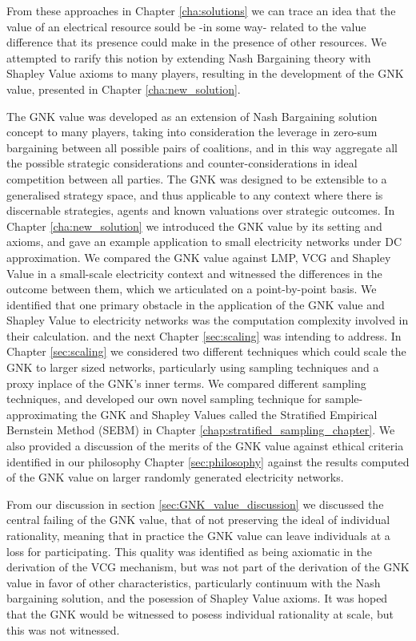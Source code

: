 From these approaches in Chapter \ref{cha:solutions} we can trace an idea that the value of an electrical resource sould be -in some way- related to the value difference that its presence could make in the presence of other resources.
We attempted to rarify this notion by extending Nash Bargaining theory with Shapley Value axioms to many players, resulting in the development of the GNK value, presented in Chapter \ref{cha:new_solution}.

The GNK value was developed as an extension of Nash Bargaining solution concept to many players, taking into consideration the leverage in zero-sum bargaining between all possible pairs of coalitions, and in this way aggregate all the possible strategic considerations and counter-considerations in ideal competition between all parties.
The GNK was designed to be extensible to a generalised strategy space, and thus applicable to any context where there is discernable strategies, agents and known valuations over strategic outcomes. 
In Chapter \ref{cha:new_solution} we introduced the GNK value by its setting and axioms, and gave an example application to small electricity networks under DC approximation.
We compared the GNK value against LMP, VCG and Shapley Value in a small-scale electricity context and witnessed the differences in the outcome between them, which we articulated on a point-by-point basis.
We identified that one primary obstacle in the application of the GNK value and Shapley Value to electricity networks was the computation complexity involved in their calculation.
and the next Chapter \ref{sec:scaling} was intending to address.
In Chapter \ref{sec:scaling} we considered two different techniques which could scale the GNK to larger sized networks, particularly using sampling techniques and a proxy inplace of the GNK's inner terms.
We compared different sampling techniques, and developed our own novel sampling technique for sample-approximating the GNK and Shapley Values called the Stratified Empirical Bernstein Method (SEBM) in Chapter \ref{chap:stratified_sampling_chapter}.
We also provided a discussion of the merits of the GNK value against ethical criteria identified in our philosophy Chapter \ref{sec:philosophy} against the results computed of the GNK value on larger randomly generated electricity networks.

From our discussion in section \ref{sec:GNK_value_discussion} we discussed the central failing of the GNK value, that of not preserving the ideal of individual rationality, meaning that in practice the GNK value can leave individuals at a loss for participating.
This quality was identified as being axiomatic in the derivation of the VCG mechanism, but was not part of the derivation of the GNK value in favor of other characteristics, particularly continuum with the Nash bargaining solution, and the posession of Shapley Value axioms.
It was hoped that the GNK would be witnessed to posess individual rationality at scale, but this was not witnessed.


